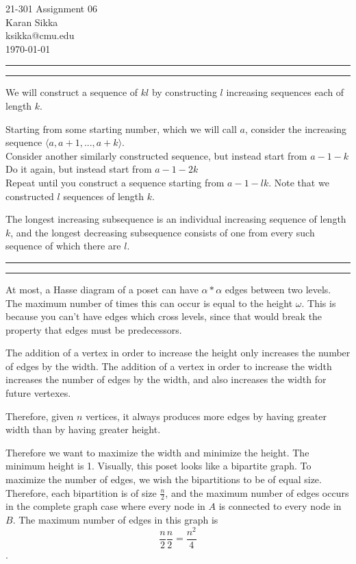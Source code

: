 \documentclass[11pt,letterpaper]{article}
\makeatletter
\newcommand{\question}[1] {\vspace{.25in} \hrule\vspace{0.5em}
\noindent{\bf #1} \vspace{0.5em}
\hrule \vspace{.10in}}
\newcommand{\myname}{Karan Sikka}
\newcommand{\myandrew}{ksikka@cmu.edu}
\newcommand{\myhwnum}{06}
\makeatother
\begin{document}
\medskip

\thispagestyle{plain}
\begin{center}                  %
{\Large 21-301 Assignment \myhwnum} \\
\myname \\
\myandrew \\
\today
\end{center}

\question{1}
We will construct a sequence of $kl$ by constructing $l$ increasing sequences each of length $k$.

Starting from some starting number, which we will call $a$, consider the increasing sequence $\langle a, a+1, ... , a + k \rangle$.\\
Consider another similarly constructed sequence, but instead start from $a - 1 - k $\\
Do it again, but instead start from $a - 1 - 2k $\\
Repeat until you construct a sequence starting from $a - 1 - lk $. Note that we constructed $l$ sequences of length $k$.

The longest increasing subsequence is an individual increasing sequence of length $k$,
and the longest decreasing subsequence consists of one from every such sequence of which there are $l$.


\question{2}
At most, a Hasse diagram of a poset can have $\alpha * \alpha$ edges between two levels.
The maximum number of times this can occur is equal to the height $\omega$.
This is because you can't have edges which cross levels, since that would break the property that edges must be predecessors.

The addition of a vertex in order to increase the height only increases the number of edges by the width. 
The addition of a vertex in order to increase the width increases the number of edges by the width, and also increases the width for future vertexes.

Therefore, given $n$ vertices, it always produces more edges by having greater width than by having greater height.

Therefore we want to maximize the width and minimize the height.
The minimum height is 1. Visually, this poset looks like a bipartite graph. To maximize the number of edges, we wish the bipartitions to be of equal size.
Therefore, each bipartition is of size $\frac{n}{2}$, and the maximum number of edges occurs in the complete graph case where every node
in $A$ is connected to every node in $B$. The maximum number of edges in this graph is $$\frac{n}{2} \frac{n}{2} = \frac{n^2}{4}$$.
\end{document}
